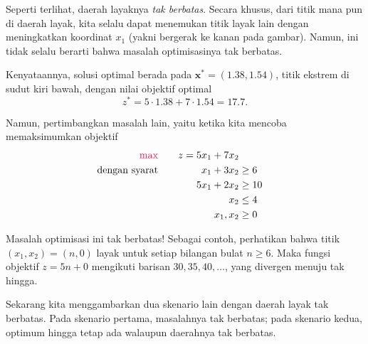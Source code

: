 
Seperti terlihat, daerah layaknya \emph{tak berbatas}. Secara khusus, dari titik mana pun di daerah layak, kita selalu dapat menemukan titik layak lain dengan meningkatkan koordinat $x_1$ (yakni bergerak ke kanan pada gambar). Namun, ini tidak selalu berarti bahwa masalah optimisasinya tak berbatas.

Kenyataannya, solusi optimal berada pada $\mathbf{x}^* = (1.38, 1.54)$, titik ekstrem di sudut kiri bawah,
dengan nilai objektif optimal
$$
z^* = 5 \cdot 1.38 + 7\cdot 1.54 = 17.7.
$$

Namun, pertimbangkan masalah lain, yaitu ketika kita mencoba memaksimumkan objektif
\begin{align*}
{\color{red} \max }\quad && z = 5x_1 + 7x_2  \\
\text{dengan syarat} \quad && x_1 + 3x_2 &\geq 6 \\
&& 5x_1 + 2x_2 &\geq 10 \\
&& x_2 &\leq 4 \\
&& x_1, x_2 &\geq 0
\end{align*}

\begin{solution}
Masalah optimisasi ini tak berbatas! Sebagai contoh, perhatikan bahwa titik $(x_1,x_2) = (n,0)$ layak untuk setiap bilangan bulat $n\geq 6$. Maka fungsi objektif $z = 5n + 0$ mengikuti barisan $30, 35, 40, \dots$, yang divergen menuju tak hingga.
\end{solution}

Sekarang kita menggambarkan dua skenario lain dengan daerah layak tak berbatas. Pada skenario pertama, masalahnya tak berbatas; pada skenario kedua, optimum hingga tetap ada walaupun daerahnya tak berbatas.

